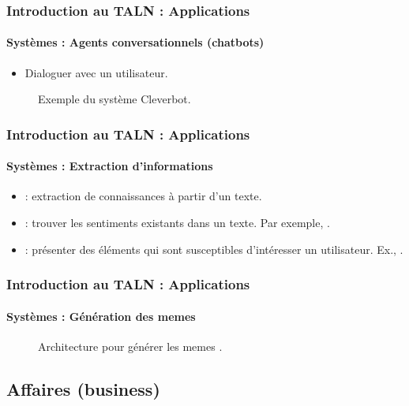 \documentclass[xcolor=table]{beamer}
\begin{document}
\begin{frame}
\frametitle{Introduction au TALN : Applications}
\framesubtitle{Systèmes : Agents conversationnels (chatbots)}

\begin{itemize}
	\item Dialoguer avec un utilisateur.
\end{itemize}

\begin{figure}
	\centering
	\caption{Exemple du système Cleverbot.}
\end{figure}

\end{frame}

\begin{frame}
\frametitle{Introduction au TALN : Applications}
\framesubtitle{Systèmes : Extraction d'informations}

\begin{itemize}
	\item {} : extraction de connaissances à partir d'un texte.
	\item {} : trouver les sentiments existants dans un texte. 
	Par exemple, .
	\item {} : présenter des éléments qui sont susceptibles d'intéresser un utilisateur. 
	Ex., .
\end{itemize}

\end{frame}

\begin{frame}
\frametitle{Introduction au TALN : Applications}
\framesubtitle{Systèmes : Génération des memes}

\begin{figure}
	\centering
	\caption{Architecture pour générer les memes \cite{sadasivam2020memebot}.}
\end{figure}

\end{frame}


\subsection{Affaires (business)}
\end{document}
